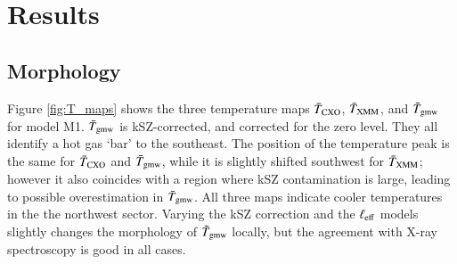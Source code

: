 \documentclass[twocolumn,traditabstract]{aa}
\begin{document}
\section{Results}\label{sec:results}
\subsection{Morphology}
Figure \ref{fig:T_maps} shows the three temperature maps $\bar{T}_{\rm CXO}$, $\bar{T}_{\rm XMM}$, and $\bar{T}_{\rm gmw}$ for model M1. $\bar{T}_{\rm gmw}$ is kSZ-corrected, and corrected for the zero level. They all identify a hot gas `bar' to the southeast. The position of the temperature peak is the same for $\bar{T}_{\rm CXO}$ and $\bar{T}_{\rm gmw}$, while it is slightly shifted southwest for $\bar{T}_{\rm XMM}$; however it also coincides with a region where kSZ contamination is large, leading to possible overestimation in $\bar{T}_{\rm gmw}$. All three maps indicate cooler temperatures in the  the northwest sector. Varying the kSZ correction and the $\ell_{\rm eff}$ models slightly changes the morphology of $\bar{T}_{\rm gmw}$ locally, but the agreement with X-ray spectroscopy is good in all cases.

\end{document}

